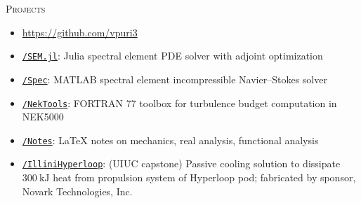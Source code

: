 \documentclass[10pt]{article}
\begin{document}
\begin{multicols}{2}
\textsc{Projects}
\columnbreak

\vspace{-1.75em}
\begin{itemize}[label=-]
    \setlength{\itemindent}{-1.50em}
    \setlength\itemsep{-0.25em}
    \item[]\hspace{-1.00em}\url{https://github.com/vpuri3}
     \item \href{https://github.com/vpuri3/SEM.jl}{\texttt{/SEM.jl}}: Julia spectral element PDE solver with adjoint optimization
    \item \href{https://github.com/vpuri3/Spec}{\texttt{/Spec}}: MATLAB spectral element incompressible Navier--Stokes solver
    \item \href{https://github.com/vpuri3/NekTools}{\texttt{/NekTools}}: FORTRAN 77 toolbox for turbulence budget computation in NEK5000
    \item \href{https://github.com/vpuri3/Notes}{\texttt{/Notes}}: \LaTeX{} notes on mechanics, real analysis, functional analysis
    \item \href{https://github.com/vpuri3/IlliniHyperloop}{\texttt{/IlliniHyperloop}}: (UIUC capstone) Passive cooling solution to dissipate $\SI{300}{\kilo \joule}$ heat from propulsion system of Hyperloop pod; fabricated by sponsor, Novark Technologies, Inc.
\end{itemize}
\vspace{-2.0em}

\end{multicols}
\vspace{-1.5em}
\vfill
\end{document}
